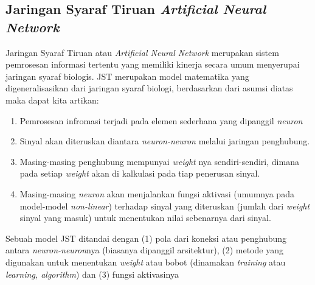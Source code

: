  \subsection{Jaringan Syaraf Tiruan \emph{Artificial Neural Network}}
 Jaringan Syaraf Tiruan atau \emph{Artificial Neural Network} merupakan sistem pemrosesan informasi tertentu yang memiliki kinerja secara umum menyerupai jaringan syaraf biologis. JST merupakan model matematika yang digeneralisasikan dari jaringan syaraf biologi, berdasarkan dari asumsi diatas maka dapat kita artikan:
 \begin{enumerate}
 	\item Pemrosesan infromasi terjadi pada elemen sederhana yang dipanggil \emph{neuron}
 	\item Sinyal akan diteruskan diantara \emph{neuron-neuron} melalui jaringan penghubung.
 	\item Masing-masing penghubung mempunyai \emph{weight} nya sendiri-sendiri, dimana pada setiap \emph{weight} akan di kalkulasi pada tiap penerusan sinyal.
 	\item Masing-masing \emph{neuron} akan menjalankan fungsi aktivasi (umumnya pada model-model \emph{non-linear}) terhadap sinyal yang diteruskan (jumlah dari \emph{weight} sinyal yang masuk) untuk menentukan nilai sebenarnya dari sinyal.
 \end{enumerate}
Sebuah model JST ditandai dengan (1) pola dari koneksi atau penghubung antara \emph{neuron-neuron}nya (biasanya dipanggil arsitektur), (2) metode yang digunakan untuk menentukan \emph{weight} atau bobot (dinamakan \emph{training} atau \emph{learning, algorithm}) dan (3) fungsi aktivasinya \cite{fausett1994fundamentals}


